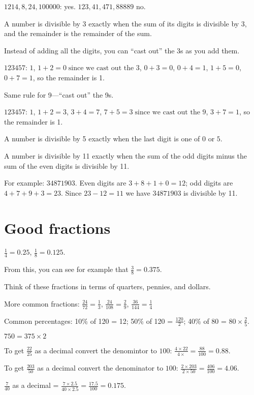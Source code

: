 \documentclass[fullpage,twocolumn]{article}
\begin{document}
$1214, 8, 24, 100000$: yes. $123, 41, 471, 88889$ no.

A number is divisible by 3 exactly when the sum of its digits is divisible by
$3$, and the remainder is the remainder of the sum. 

Instead of adding all the digits, you can ``cast out'' the 3s as you add them.

$123457$: $1$, $1+2=0 \; \mbox{since we cast out the 3}$, $0+3 = 0$,
$0+4 = 1$, $1+5 = 0$, $0+7=1$, so the remainder is 1.

Same rule for 9---``cast out'' the 9s.

$123457$: $1$, $1+2=3$, $3+4 = 7$,
$7+5 = 3 \; \mbox{since we cast out the 9}$, 
$3+7=1$, so the remainder is 1.

A number is divisible by 5 exactly when the last digit is one of $0$ or $5$.

A number is divisible by 11 exactly when the sum of the odd digits minus the sum
of the even digits is divisible by 11.

For example: $34871903$. Even digits are $3+8+1+0=12$; odd
digits are $4+7+9+3=23$. Since $23-12=11$ we have $34871903$ is divisible by 11.


\section{Good fractions}

$\frac{1}{4} = 0.25$, $\frac{1}{8} = 0.125$. 

From this, you can see for example that $\frac{3}{8} = 0.375$. 

Think of these fractions in terms of quarters, pennies, and dollars.

More common fractions: 
$\frac{24}{72} = \frac{1}{3}$, $\frac{24}{108} = \frac{2}{9}$, $\frac{36}{144} = \frac{1}{4}$

Common percentages: 10\% of 120 = 12; 50\% of 120 = $\frac{120}{2}$; 
40\% of 80 = $80 \times \frac{2}{5}$.

$750 =  375 \times 2$

To get $\frac{22}{25}$ as a decimal convert the 
denomintor to $100$: $\frac{4\times 22}{4\times} = \frac{88}{100} = 0.88$.

To get $\frac{203}{50}$ as a decimal convert the 
denominator to $100$: $\frac{2 \times 203}{2 \times 50} = \frac{406}{100} = 4.06$.

$\frac{7}{40}$ as a decimal = $\frac{7 \times 2.5 }{40 \times 2.5} = \frac{17.5}{100} = 0.175$.
\end{document}
